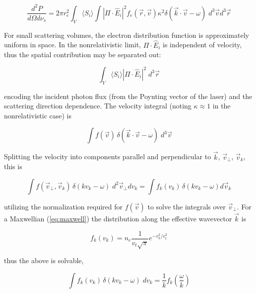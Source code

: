 \begin{equation}\label{eq:ts_powerspectrumint}
 \frac{d^2 P}{d\Omega d\nu_s} = 2\pi r_e^2 \int_{V} \langle S_i \rangle \int \left| \Pi \cdot \hat{E}_i \right|^2 f_e(\vec{r},\vec{v}) \kappa^2 \delta(\vec{k} \cdot \vec{v} - \omega) \;d^3 \vec{v} d^3 \vec{r}
\end{equation}

\noindent For small scattering volumes, the electron distribution function is approximately uniform in space.  In the nonrelativistic limit, $\Pi \cdot \hat{E}_i$ is independent of velocity, thus the spatial contribution may be separated out:

\begin{equation}
 \int_V \langle S_i \rangle \left| \Pi \cdot \hat{E}_i \right|^2 \;d^3 \vec{r}
\end{equation}

\noindent encoding the incident photon flux (from the Poynting vector of the laser) and the scattering direction dependence.  The velocity integral (noting $\kappa \approx 1$ in the nonrelativistic case) is

\begin{equation}
 \int f(\vec{v}) \, \delta(\vec{k} \cdot \vec{v} - \omega) \;d^3 \vec{v}
\end{equation}

\noindent Splitting the velocity into components parallel and perpendicular to $\vec{k}$, $\vec{v}_\perp$, $\vec{v}_k$, this is

\begin{equation}
 \int f(\vec{v}_\perp,\vec{v}_k) \, \delta(kv_k - \omega) \;d^2 \vec{v}_\perp dv_k = \int f_k(v_k) \,\delta(kv_k - \omega) d\vec{v}_k
\end{equation}

\noindent utilizing the normalization required for $f(\vec{v})$ to solve the integrals over $\vec{v}_\perp$.  For a Maxwellian (\cref{eq:maxwell}) the distribution along the effective wavevector $\vec{k}$ is

\begin{equation}\label{eq:ts_fk}
 f_k(v_k) = n_e \frac{1}{v_t \sqrt{\pi}} e^{-v_k^2/v_t^2}
\end{equation}

\noindent thus the above is solvable,

\begin{equation}
 \int f_k(v_k) \,\delta(kv_k - \omega) \;dv_k = \frac{1}{k} f_k\left(\frac{\omega}{k}\right)
\end{equation}

